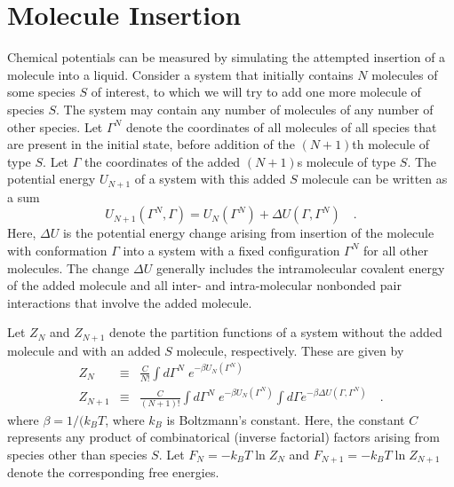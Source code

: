 \documentclass[12pt]{article}
\newcommand\system{\Gamma^{N}}
\newcommand\chain{\Gamma}
\newcommand\Utot{U_{N+1}}
\newcommand\Usys{U_{N}}
\newcommand\delU{\Delta U}
\newcommand\Ztot{Z_{N+1}}
\newcommand\Zsystem{Z_{N}}
\newcommand\Ftot{F_{N+1}}
\newcommand\Fsystem{F_{N}}
\begin{document}
\section{Molecule Insertion}
Chemical potentials can be measured by simulating the attempted insertion of a molecule into a liquid.  Consider a system that initially contains $N$ molecules of some species $S$ of interest, to which we will try to add one more molecule of species $S$. The system may contain any number of molecules of any number of other species. Let $\system$ denote the coordinates of all molecules of all species that are present in the initial state, before addition of the $(N+1)$th molecule of type $S$. Let $\chain$ the coordinates of the added $(N+1)$s molecule of type $S$. The potential energy $\Utot$ of a system with this added $S$ molecule can be written as a sum 
\begin{equation}
    \Utot(\system, \chain) = \Usys(\system) + \delU (\chain, \system) 
    \quad. \label{UtotSum}
\end{equation}
Here, $\delU$ is the potential energy change arising from insertion of the molecule with conformation $\chain$ into a system with a fixed configuration $\system$ for all other molecules. The change $\delU$ generally includes the intramolecular covalent energy of the added molecule and all inter- and intra-molecular nonbonded pair interactions that involve the added molecule. 

Let $\Zsystem$ and $\Ztot$ denote the partition functions of a system without the added molecule and with an added $S$ molecule, respectively. These are given by
\begin{eqnarray}
    \Zsystem & \equiv & \frac{C}{N!}\int d\system \; e^{-\beta \Usys(\system)} 
    \label{ZsystemDef} \\
    \Ztot  & \equiv & \frac{C}{(N+1)!}\int d\system \; e^{-\beta \Usys(\system)} 
                       \int d\chain e^{-\beta \delU(\chain, \system)}
    \label{ZtotDef}
    \quad.
\end{eqnarray}
where $\beta = 1/(k_{B}T$, where $k_{B}$ is Boltzmann's constant.  Here, the constant $C$ represents any product of combinatorical (inverse factorial) factors arising from species other than species $S$.  Let $\Fsystem = -k_{B}T\ln \Zsystem$ and $\Ftot = -k_{B}T\ln \Ztot$ denote the corresponding free energies.  
\end{document}
